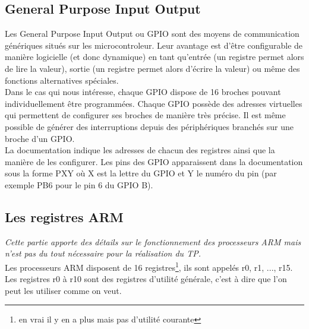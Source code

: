 \documentclass[a4paper,10pt]{article} %
\begin{document}
\subsection{\label{gpio}General Purpose Input Output}
Les General Purpose Input Output ou GPIO sont des moyens de communication génériques situés sur les microcontroleur. Leur avantage est d'être configurable de manière logicielle (et donc dynamique) en tant qu'entrée (un registre permet alors de lire la valeur), sortie (un registre permet alors d'écrire la valeur) ou même des fonctions alternatives spéciales.\\

Dans le cas qui nous intéresse, chaque GPIO dispose de 16 broches pouvant individuellement être programmées. Chaque GPIO possède des adresses virtuelles qui permettent de configurer ses broches de manière très précise. Il est même possible de générer des interruptions depuis des périphériques branchés sur une broche d'un GPIO.\\

La documentation indique les adresses de chacun des registres ainsi que la manière de les configurer. Les pins des GPIO apparaissent dans la documentation sous la forme PXY où X est la lettre du GPIO et Y le numéro du pin (par exemple PB6 pour le pin 6 du GPIO B).

\subsection{Les registres ARM}
\textit{Cette partie apporte des détails sur le fonctionnement des processeurs ARM mais n'est pas du tout nécessaire pour la réalisation du TP.}\\

Les processeurs ARM disposent de 16 registres\footnote{en vrai il y en a plus mais pas d'utilité courante}, ils sont appelés r0, r1, ..., r15.\\

Les registres r0 à r10 sont des registres d'utilité générale, c'est à dire que l'on peut les utiliser comme on veut.\\
\end{document}
